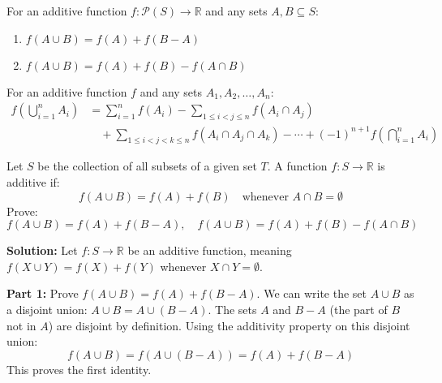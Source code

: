 \begin{theorem}
For an additive function $f: \mathcal{P}(S) \to \mathbb{R}$ and any sets $A, B \subseteq S$:
\begin{enumerate}
\item $f(A \cup B) = f(A) + f(B - A)$
\item $f(A \cup B) = f(A) + f(B) - f(A \cap B)$
\end{enumerate}
\end{theorem}

\begin{theorem}
For an additive function $f$ and any sets $A_1, A_2, \ldots, A_n$:
\begin{align*}
f\left(\bigcup_{i=1}^n A_i\right) &= \sum_{i=1}^n f(A_i) - \sum_{1 \leq i < j \leq n} f(A_i \cap A_j) \\
&\quad + \sum_{1 \leq i < j < k \leq n} f(A_i \cap A_j \cap A_k) - \cdots + (-1)^{n+1} f\left(\bigcap_{i=1}^n A_i\right)
\end{align*}
\end{theorem}

\begin{problembox}
Let \( S \) be the collection of all subsets of a given set \( T \).  
A function \( f: S \to \mathbb{R} \) is additive if:
\[
f(A \cup B) = f(A) + f(B)
\quad \text{whenever } A \cap B = \emptyset
\]  
Prove:  
\[
f(A \cup B) = f(A) + f(B - A), \quad 
f(A \cup B) = f(A) + f(B) - f(A \cap B)
\]
\end{problembox}

\textbf{Solution:}  
Let $f: S \to \mathbb{R}$ be an additive function, meaning $f(X \cup Y) = f(X) + f(Y)$ whenever $X \cap Y = \emptyset$.

\textbf{Part 1:} Prove $f(A \cup B) = f(A) + f(B - A)$.
We can write the set $A \cup B$ as a disjoint union: $A \cup B = A \cup (B - A)$. The sets $A$ and $B-A$ (the part of $B$ not in $A$) are disjoint by definition.
Using the additivity property on this disjoint union:
\[ f(A \cup B) = f(A \cup (B-A)) = f(A) + f(B-A) \]
This proves the first identity.

